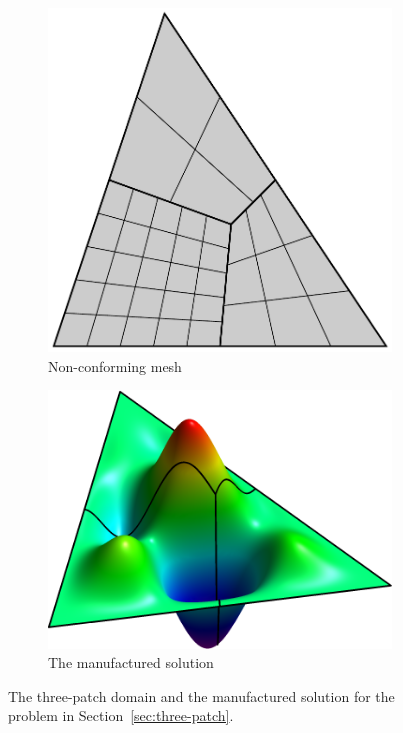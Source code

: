 \begin{figure}[ht]
	\centering
	\begin{subfigure}[b]{0.33\textwidth}
		\includegraphics[width=\textwidth]{three_patch_basic}
		\caption{Non-conforming mesh}
	\end{subfigure}
	\begin{subfigure}[b]{0.41\textwidth}
		\includegraphics[width=\textwidth]{three_patches_solution-plot}
		\caption{The manufactured solution}
	\end{subfigure}
	\caption{The three-patch domain and the manufactured solution for the problem in Section~\ref{sec:three-patch}.}\label{fig:three_patch_biharmonic_problem}
\end{figure}

